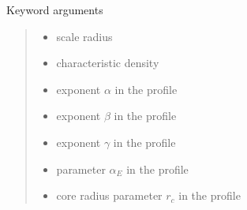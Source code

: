 \documentclass[letterpaper,10pt,english]{sphinxmanual}
\begin{document}
\begin{fulllineitems}
\begin{quote}
\begin{description}
\begin{itemize}
\end{itemize}

\end{description}\end{quote}

\sphinxAtStartPar
Keyword arguments
\begin{quote}\begin{description}
\begin{itemize}
\item {} 
\sphinxAtStartPar
{} \textendash{} scale radius

\item {} 
\sphinxAtStartPar
{} \textendash{} characteristic density

\item {} 
\sphinxAtStartPar
{} \textendash{} exponent \(\alpha\) in the {\hyperref[\detokenize{diffsph.profiles:diffsph.profiles.templates.hdz}]{}} profile

\item {} 
\sphinxAtStartPar
{} \textendash{} exponent \(\beta\) in the {\hyperref[\detokenize{diffsph.profiles:diffsph.profiles.templates.hdz}]{}} profile

\item {} 
\sphinxAtStartPar
{} \textendash{} exponent \(\gamma\) in the {\hyperref[\detokenize{diffsph.profiles:diffsph.profiles.templates.hdz}]{}} profile

\item {} 
\sphinxAtStartPar
{} \textendash{} parameter \(\alpha_E\) in the {\hyperref[\detokenize{diffsph.profiles:diffsph.profiles.templates.enst}]{}} profile

\item {} 
\sphinxAtStartPar
{} \textendash{} core radius parameter \(r_c\) in the {\hyperref[\detokenize{diffsph.profiles:diffsph.profiles.templates.cnfw}]{}} profile


\end{itemize}
\end{description}
\end{quote}
\end{fulllineitems}
\end{document}
